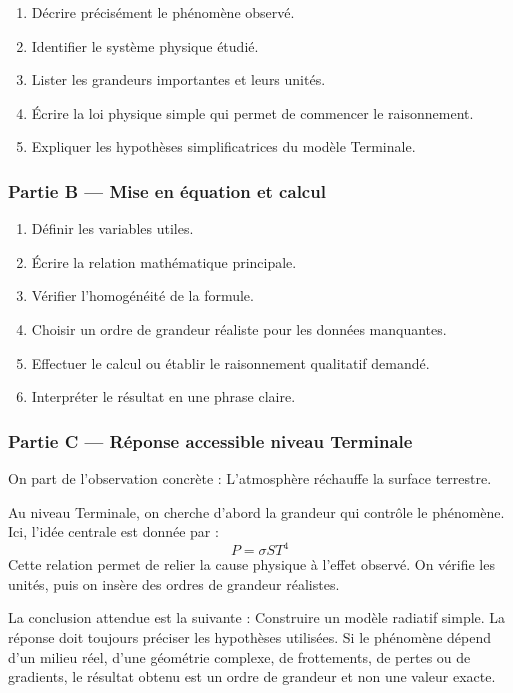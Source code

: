 \documentclass[11pt,a4paper]{article}
\begin{document}
\begin{enumerate}
  \item Décrire précisément le phénomène observé.
  \item Identifier le système physique étudié.
  \item Lister les grandeurs importantes et leurs unités.
  \item Écrire la loi physique simple qui permet de commencer le raisonnement.
  \item Expliquer les hypothèses simplificatrices du modèle Terminale.
\end{enumerate}

\subsubsection*{Partie B — Mise en équation et calcul}

\begin{enumerate}
  \item Définir les variables utiles.
  \item Écrire la relation mathématique principale.
  \item Vérifier l'homogénéité de la formule.
  \item Choisir un ordre de grandeur réaliste pour les données manquantes.
  \item Effectuer le calcul ou établir le raisonnement qualitatif demandé.
  \item Interpréter le résultat en une phrase claire.
\end{enumerate}

\subsubsection*{Partie C — Réponse accessible niveau Terminale}

\begin{corrigebox}
On part de l'observation concrète : L'atmosphère réchauffe la surface terrestre.

Au niveau Terminale, on cherche d'abord la grandeur qui contrôle le phénomène. Ici, l'idée centrale est donnée par :
\[
P=\sigma S T^4
\]
Cette relation permet de relier la cause physique à l'effet observé. On vérifie les unités, puis on insère des ordres de grandeur réalistes.

La conclusion attendue est la suivante : Construire un modèle radiatif simple. La réponse doit toujours préciser les hypothèses utilisées. Si le phénomène dépend d'un milieu réel, d'une géométrie complexe, de frottements, de pertes ou de gradients, le résultat obtenu est un ordre de grandeur et non une valeur exacte.
\end{corrigebox}
\end{document}
